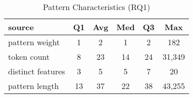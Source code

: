 \begin{table}[tb]
\begin{center}
\caption{Pattern Characteristics (RQ1)}
\label{table:patternStats}

\begin{tabular}{l|ccccc}
\toprule
source & Q1 & Avg & Med & Q3 & Max \\ 
\midrule
pattern weight & 1 & 2 & 1 & 2 & 182 \\ 
\midrule
token count & 8 & 23 & 14 & 24 & 31,349 \\ 
\midrule
distinct features & 3 & 5 & 5 & 7 & 20 \\ 
\midrule
pattern length & 13 & 37 & 22 & 38 & 43,255 \\ 
\bottomrule
\end{tabular}
\end{center}
\end{table}
